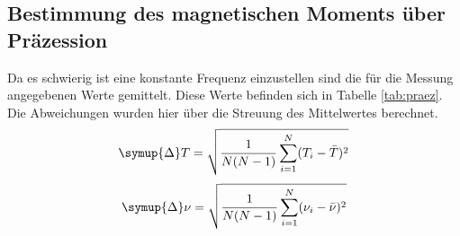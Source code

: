\subsection{Bestimmung des magnetischen Moments über Präzession}
Da es schwierig ist eine konstante Frequenz einzustellen sind die für die Messung angegebenen Werte gemittelt.
Diese Werte befinden sich in Tabelle \ref{tab:praez}. Die Abweichungen wurden hier über die Streuung des Mittelwertes berechnet.
\begin{equation*}
  \symup{\Delta} T = \sqrt{\frac{1}{N(N-1)}\sum_{i=1}^{N}(T_i-\bar{T})^2}
\end{equation*}
\begin{equation*}
  \symup{\Delta} \nu = \sqrt{\frac{1}{N(N-1)}\sum_{i=1}^{N}(\nu_i-\bar{\nu})^2}
\end{equation*}

